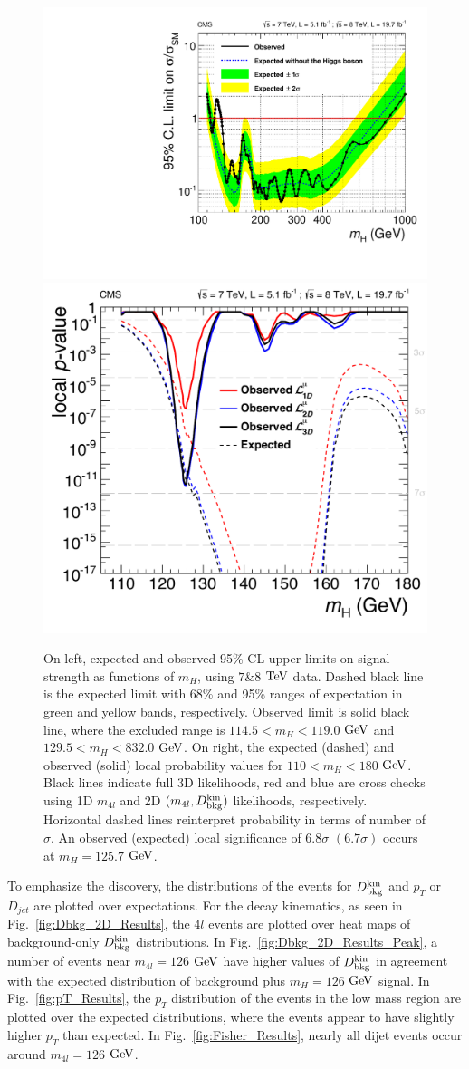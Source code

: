 \begin{figure}[htbp]
\begin{center}
\includegraphics[width=.45\linewidth]{HiggsDiscovery/figures/UpperLimit_ASCLS_7p8TeV_wholeMass_Final2_2l2tau.pdf}
\includegraphics[width=.45\linewidth]{HiggsDiscovery/figures/Pvals_PLP_lowMass_1D2D3D_Final3_no2l2tau_7p8sep.pdf}
\caption[Exclusion Limits and Local Probabilities for $4l$ Events]{On left, expected and observed 95\% CL upper limits on signal strength as functions of $m_{H}$, using $7\&8$ $\rm{TeV}$ data. Dashed black line is the expected limit with 68\% and 95\% ranges of expectation in green and yellow bands, respectively. Observed limit is solid black line, where the excluded range is $114.5<m_H<119.0$ $\rm{GeV}$ and $129.5<m_H<832.0$ $\rm{GeV}$. On right, the expected (dashed) and observed (solid) local probability values for $110<m_{H}<180$ $\rm{GeV}$. Black lines indicate full 3D likelihoods, red and blue are cross checks using 1D $m_{4l}$ and 2D $(m_{4l},D_{\rm{bkg}}^{\rm{kin}})$ likelihoods, respectively. Horizontal dashed lines reinterpret probability in terms of number of $\sigma$. An observed (expected) local significance of $6.8\sigma$ $(6.7\sigma)$ occurs at $m_H=125.7$ $\rm{GeV}$.}
\label{fig:ExclusionLimits}
\end{center}
\end{figure}

To emphasize the discovery, the distributions of the events for $D_{\rm{bkg}}^{\rm{kin}}$ and $p_T$ or $D_{jet}$ are plotted over expectations. For the decay kinematics, as seen in Fig.~\ref{fig:Dbkg_2D_Results}, the $4l$ events are plotted over heat maps of background-only $D_{\rm{bkg}}^{\rm{kin}}$ distributions. In Fig.~\ref{fig:Dbkg_2D_Results_Peak}, a number of events near $m_{4l}=126$ $\rm{GeV}$ have higher values of $D_{\rm{bkg}}^{\rm{kin}}$ in agreement with the expected distribution of background plus $m_H=126$ $\rm{GeV}$ signal. In Fig.~\ref{fig:pT_Results}, the $p_T$ distribution of the events in the low mass region are plotted over the expected distributions, where the events appear to have slightly higher $p_T$ than expected. In Fig.~\ref{fig:Fisher_Results}, nearly all dijet events occur around $m_{4l}=126$ $\rm{GeV}$.

